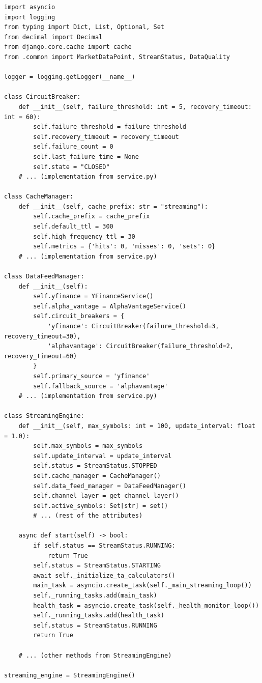 \documentclass[12pt]{article}
\begin{document}
\begin{verbatim}
import asyncio
import logging
from typing import Dict, List, Optional, Set
from decimal import Decimal
from django.core.cache import cache
from .common import MarketDataPoint, StreamStatus, DataQuality

logger = logging.getLogger(__name__)

class CircuitBreaker:
    def __init__(self, failure_threshold: int = 5, recovery_timeout: int = 60):
        self.failure_threshold = failure_threshold
        self.recovery_timeout = recovery_timeout
        self.failure_count = 0
        self.last_failure_time = None
        self.state = "CLOSED"
    # ... (implementation from service.py)

class CacheManager:
    def __init__(self, cache_prefix: str = "streaming"):
        self.cache_prefix = cache_prefix
        self.default_ttl = 300
        self.high_frequency_ttl = 30
        self.metrics = {'hits': 0, 'misses': 0, 'sets': 0}
    # ... (implementation from service.py)

class DataFeedManager:
    def __init__(self):
        self.yfinance = YFinanceService()
        self.alpha_vantage = AlphaVantageService()
        self.circuit_breakers = {
            'yfinance': CircuitBreaker(failure_threshold=3, recovery_timeout=30),
            'alphavantage': CircuitBreaker(failure_threshold=2, recovery_timeout=60)
        }
        self.primary_source = 'yfinance'
        self.fallback_source = 'alphavantage'
    # ... (implementation from service.py)

class StreamingEngine:
    def __init__(self, max_symbols: int = 100, update_interval: float = 1.0):
        self.max_symbols = max_symbols
        self.update_interval = update_interval
        self.status = StreamStatus.STOPPED
        self.cache_manager = CacheManager()
        self.data_feed_manager = DataFeedManager()
        self.channel_layer = get_channel_layer()
        self.active_symbols: Set[str] = set()
        # ... (rest of the attributes)
    
    async def start(self) -> bool:
        if self.status == StreamStatus.RUNNING:
            return True
        self.status = StreamStatus.STARTING
        await self._initialize_ta_calculators()
        main_task = asyncio.create_task(self._main_streaming_loop())
        self._running_tasks.add(main_task)
        health_task = asyncio.create_task(self._health_monitor_loop())
        self._running_tasks.add(health_task)
        self.status = StreamStatus.RUNNING
        return True

    # ... (other methods from StreamingEngine)

streaming_engine = StreamingEngine()
\end{verbatim}
\end{document}
